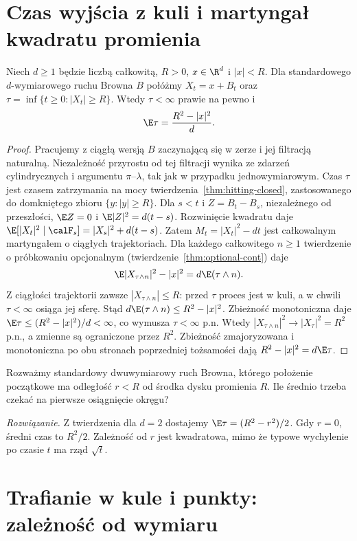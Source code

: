 \section{Czas wyjścia z kuli i martyngał kwadratu promienia}
\begin{twierdzenie}
Niech $d\ge1$ będzie liczbą całkowitą, $R>0$,
$x\in\R^d$ i $|x|<R$.
Dla standardowego $d$-wymiarowego ruchu Browna $B$ połóżmy
$X_t=x+B_t$ oraz $\tau=\inf\{t\ge0:|X_t|\ge R\}$.
Wtedy $\tau<\infty$ prawie na pewno i
\[
\E\tau=\frac{R^2-|x|^2}{d}.
\]
\end{twierdzenie}
\begin{proof}
Pracujemy z ciągłą wersją $B$ zaczynającą się w zerze
i jej filtracją naturalną. Niezależność przyrostu od
tej filtracji wynika ze zdarzeń cylindrycznych i argumentu
$\pi$--$\lambda$, tak jak w przypadku jednowymiarowym.
Czas $\tau$ jest czasem zatrzymania na mocy
twierdzenia~\ref{thm:hitting-closed}, zastosowanego do
domkniętego zbioru $\{y:|y|\ge R\}$.
Dla $s<t$ i $Z=B_t-B_s$, niezależnego od przeszłości,
$\E Z=0$ i $\E|Z|^2=d(t-s)$. Rozwinięcie kwadratu daje
$\E[|X_t|^2\mid\calF_s]=|X_s|^2+d(t-s)$.
Zatem $M_t=|X_t|^2-dt$ jest całkowalnym martyngałem
o ciągłych trajektoriach. Dla każdego całkowitego $n\ge1$
twierdzenie o próbkowaniu opcjonalnym
(twierdzenie~\ref{thm:optional-cont}) daje
\[
\E|X_{\tau\wedge n}|^2-|x|^2=d\E(\tau\wedge n).
\]
Z ciągłości trajektorii zawsze $|X_{\tau\wedge n}|\le R$:
przed $\tau$ proces jest w kuli, a w chwili $\tau<\infty$
osiąga jej sferę. Stąd $d\E(\tau\wedge n)\le R^2-|x|^2$.
Zbieżność monotoniczna daje $\E\tau\le (R^2-|x|^2)/d<\infty$,
co wymusza $\tau<\infty$ p.n. Wtedy
$|X_{\tau\wedge n}|^2\to|X_\tau|^2=R^2$ p.n., a
zmienne są ograniczone przez $R^2$. Zbieżność zmajoryzowana
i monotoniczna po obu stronach poprzedniej tożsamości dają
$R^2-|x|^2=d\E\tau$.
\end{proof}

\begin{zadanie}
Rozważmy standardowy dwuwymiarowy ruch Browna, którego
położenie początkowe ma odległość $r<R$ od środka dysku
promienia $R$. Ile średnio trzeba czekać na pierwsze osiągnięcie
okręgu?

\emph{Rozwiązanie.} Z twierdzenia dla $d=2$ dostajemy
$\E\tau=(R^2-r^2)/2$. Gdy $r=0$, średni czas to $R^2/2$.
Zależność od $r$ jest kwadratowa, mimo że typowe wychylenie
po czasie $t$ ma rząd $\sqrt t$.
\end{zadanie}

\section{Trafianie w kule i punkty: zależność od wymiaru}

